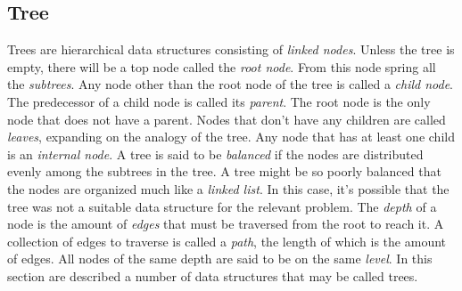 \documentclass{article}
\begin{document}
\subsection{Tree}
Trees are hierarchical data structures consisting of {\em linked nodes}. Unless the tree is empty, there will be a
top node called the {\em root node}. From this node spring all the {\em subtrees}. Any node other than the root node
of the tree is called a {\em child node}. The predecessor of a child node is called its {\em parent}. The root node
is the only node that does not have a parent. Nodes that don't have any children are called {\em leaves}, expanding
on the analogy of the tree. Any node that has at least one child is an {\em internal node}. A tree is said to be
{\em balanced} if the nodes are distributed evenly among the subtrees in the tree. A tree might be so poorly
balanced that the nodes are organized much like a {\em linked list}. In this case, it's possible that the tree was
not a suitable data structure for the relevant problem. The {\em depth} of a node is the amount of {\em edges} that
must be traversed from the root to reach it. A collection of edges to traverse is called a {\em path}, the length of
which is the amount of edges. All nodes of the same depth are said to be on the same {\em level}.
In this section are described a number of data structures that may be called trees.
\end{document}
